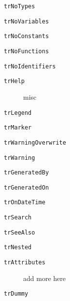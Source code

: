 \documentclass{report}
\newif\ifpdf
\begin{document}
\begin{list}{}
\begin{description}
\item[\texttt{trNoTypes}] \label{PasDoc_Languages-trNoTypes}
\index{}
 
\item[\texttt{trNoVariables}] \label{PasDoc_Languages-trNoVariables}
\index{}
 
\item[\texttt{trNoConstants}] \label{PasDoc_Languages-trNoConstants}
\index{}
 
\item[\texttt{trNoFunctions}] \label{PasDoc_Languages-trNoFunctions}
\index{}
 
\item[\texttt{trNoIdentifiers}] \label{PasDoc_Languages-trNoIdentifiers}
\index{}
 
\item[\texttt{trHelp}] \label{PasDoc_Languages-trHelp}
\index{}
misc
\item[\texttt{trLegend}] \label{PasDoc_Languages-trLegend}
\index{}
 
\item[\texttt{trMarker}] \label{PasDoc_Languages-trMarker}
\index{}
 
\item[\texttt{trWarningOverwrite}] \label{PasDoc_Languages-trWarningOverwrite}
\index{}
 
\item[\texttt{trWarning}] \label{PasDoc_Languages-trWarning}
\index{}
 
\item[\texttt{trGeneratedBy}] \label{PasDoc_Languages-trGeneratedBy}
\index{}
 
\item[\texttt{trGeneratedOn}] \label{PasDoc_Languages-trGeneratedOn}
\index{}
 
\item[\texttt{trOnDateTime}] \label{PasDoc_Languages-trOnDateTime}
\index{}
 
\item[\texttt{trSearch}] \label{PasDoc_Languages-trSearch}
\index{}
 
\item[\texttt{trSeeAlso}] \label{PasDoc_Languages-trSeeAlso}
\index{}
 
\item[\texttt{trNested}] \label{PasDoc_Languages-trNested}
\index{}
 
\item[\texttt{trAttributes}] \label{PasDoc_Languages-trAttributes}
\index{}
add more here
\item[\texttt{trDummy}] \label{PasDoc_Languages-trDummy}
\index{}
 
\end{description}


\end{list}
\ifpdf
\end{document}
